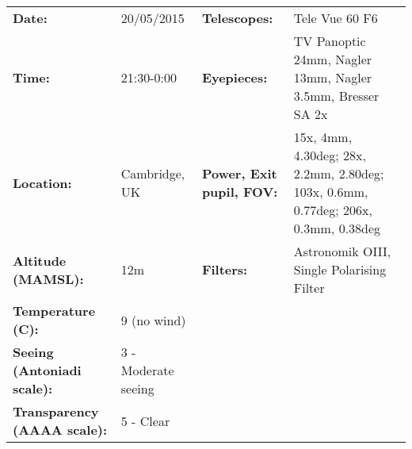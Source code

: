 \begin{tabular}{ p{1.7in} p{1.2in} p{1.5in} p{4.2in}}
{\bf Date:} & 20/05/2015 & {\bf Telescopes:} & Tele Vue 60 F6 \\ 
{\bf Time:} & 21:30-0:00 & {\bf Eyepieces:} & TV Panoptic 24mm, Nagler 13mm, Nagler 3.5mm, Bresser SA 2x \\ 
{\bf Location:} & Cambridge, UK & {\bf Power, Exit pupil, FOV:} & 15x, 4mm, 4.30deg; 28x, 2.2mm, 2.80deg; 103x, 0.6mm, 0.77deg; 206x, 0.3mm, 0.38deg \\ 
{\bf Altitude (MAMSL):} & 12m & {\bf Filters:} & Astronomik OIII, Single Polarising Filter \\ 
{\bf Temperature (C):} & 9 (no wind) & & \\ 
{\bf Seeing (Antoniadi scale):} & 3 - Moderate seeing & & \\ 
{\bf Transparency (AAAA scale):} & 5 - Clear & & \\ 
\end{tabular}
\centering 
